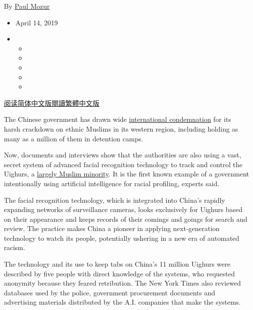 By \href{https://www.nytimes3xbfgragh.onion/by/paul-mozur}{Paul Mozur}

\begin{itemize}
\item
  April 14, 2019
\item
  \begin{itemize}
  \item
  \item
  \item
  \item
  \item
  \end{itemize}
\end{itemize}

\href{https://cn.nytimes3xbfgragh.onion/technology/20190415/china-surveillance-artificial-intelligence-racial-profiling/}{阅读简体中文版}\href{https://cn.nytimes3xbfgragh.onion/technology/20190415/china-surveillance-artificial-intelligence-racial-profiling/zh-hant/}{閱讀繁體中文版}

The Chinese government has drawn wide
\href{https://www.nytimes3xbfgragh.onion/2019/04/08/world/asia/china-muslims-camps.html?rref=collection\%2Ftimestopic\%2FUighurs\%20(Chinese\%20Ethnic\%20Group)\&action=click\&contentCollection=timestopics\&region=stream\&module=stream_unit\&version=latest\&contentPlacement=2\&pgtype=collection}{international
condemnation} for its harsh crackdown on ethnic Muslims in its western
region, including holding as many as a million of them in detention
camps.

Now, documents and interviews show that the authorities are also using a
vast, secret system of advanced facial recognition technology to track
and control the Uighurs, a
\href{https://www.nytimes3xbfgragh.onion/2018/09/08/world/asia/china-uighur-muslim-detention-camp.html}{largely
Muslim minority}. It is the first known example of a government
intentionally using artificial intelligence for racial profiling,
experts said.

The facial recognition technology, which is integrated into China's
rapidly expanding networks of surveillance cameras, looks exclusively
for Uighurs based on their appearance and keeps records of their comings
and goings for search and review. The practice makes China a pioneer in
applying next-generation technology to watch its people, potentially
ushering in a new era of automated racism.

The technology and its use to keep tabs on China's 11 million Uighurs
were described by five people with direct knowledge of the systems, who
requested anonymity because they feared retribution. The New York Times
also reviewed databases used by the police, government procurement
documents and advertising materials distributed by the A.I. companies
that make the systems.

